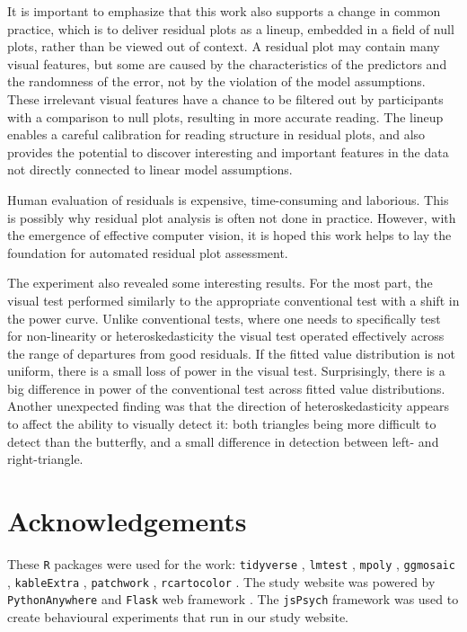 \documentclass[]{interact}
\theoremstyle{plain}%
\theoremstyle{definition}
\theoremstyle{remark}
\begin{document}
It is important to emphasize that this work also supports a change in
common practice, which is to deliver residual plots as a lineup,
embedded in a field of null plots, rather than be viewed out of context.
A residual plot may contain many visual features, but some are caused by
the characteristics of the predictors and the randomness of the error,
not by the violation of the model assumptions. These irrelevant visual
features have a chance to be filtered out by participants with a
comparison to null plots, resulting in more accurate reading. The lineup
enables a careful calibration for reading structure in residual plots,
and also provides the potential to discover interesting and important
features in the data not directly connected to linear model assumptions.

Human evaluation of residuals is expensive, time-consuming and
laborious. This is possibly why residual plot analysis is often not done
in practice. However, with the emergence of effective computer vision,
it is hoped this work helps to lay the foundation for automated residual
plot assessment.

The experiment also revealed some interesting results. For the most
part, the visual test performed similarly to the appropriate
conventional test with a shift in the power curve. Unlike conventional
tests, where one needs to specifically test for non-linearity or
heteroskedasticity the visual test operated effectively across the range
of departures from good residuals. If the fitted value distribution is
not uniform, there is a small loss of power in the visual test.
Surprisingly, there is a big difference in power of the conventional
test across fitted value distributions. Another unexpected finding was
that the direction of heteroskedasticity appears to affect the ability
to visually detect it: both triangles being more difficult to detect
than the butterfly, and a small difference in detection between left-
and right-triangle.

\hypertarget{acknowledgements}{%
\section*{Acknowledgements}\label{acknowledgements}}

These \texttt{R} packages were used for the work: \texttt{tidyverse}
\citep{tidyverse}, \texttt{lmtest} \citep{lmtest}, \texttt{mpoly}
\citep{mpoly}, \texttt{ggmosaic} \citep{ggmosaic}, \texttt{kableExtra}
\citep{kableextra}, \texttt{patchwork} \citep{patchwork},
\texttt{rcartocolor} \citep{rcartocolor}. The study website was powered
by \texttt{PythonAnywhere} \citep{pythonanywhere} and \texttt{Flask} web
framework \citep{flask}. The \texttt{jsPsych} framework \citep{jspsych}
was used to create behavioural experiments that run in our study
website.
\end{document}
